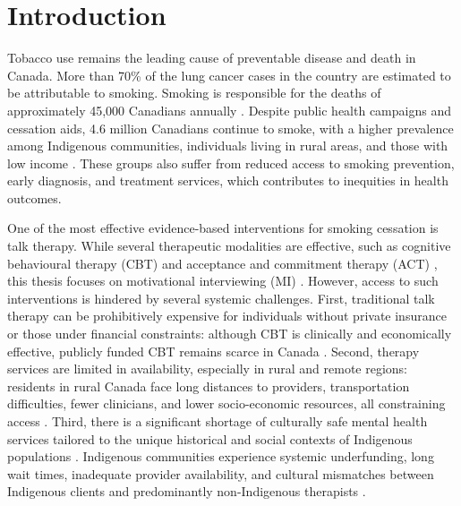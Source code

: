 \chapter{Introduction}


Tobacco use remains the leading cause of preventable disease and death in Canada. More than 70\% of the lung cancer cases in the country are estimated to be attributable to smoking. Smoking is responsible for the deaths of approximately 45,000 Canadians annually \citep{poirier2019estimates}. Despite public health campaigns and cessation aids, 4.6 million Canadians continue to smoke, with a higher prevalence among Indigenous communities, individuals living in rural areas, and those with low income \cite{cpac2020lung}. These groups also suffer from reduced access to smoking prevention, early diagnosis, and treatment services, which contributes to inequities in health outcomes.

One of the most effective evidence-based interventions for smoking cessation is talk therapy. While several therapeutic modalities are effective, such as cognitive behavioural therapy (CBT) \cite{beck2011cognitive} and acceptance and commitment therapy (ACT) \cite{hayes1999acceptance}, this thesis focuses on motivational interviewing (MI) \cite{MillerRollnick2023}. However, access to such interventions is hindered by several systemic challenges. First, traditional talk therapy can be prohibitively expensive for individuals without private insurance or those under financial constraints: although CBT is clinically and economically effective, publicly funded CBT remains scarce in Canada \cite{llewellyn2017economic}. Second, therapy services are limited in availability, especially in rural and remote regions: residents in rural Canada face long distances to providers, transportation difficulties, fewer clinicians, and lower socio-economic resources, all constraining access \cite{crosato2011rural}. Third, there is a significant shortage of culturally safe mental health services tailored to the unique historical and social contexts of Indigenous populations \cite{jones2021mental}. Indigenous communities experience systemic underfunding, long wait times, inadequate provider availability, and cultural mismatches between Indigenous clients and predominantly non-Indigenous therapists \cite{firstnationshealth2023, turner2018poverty}.


